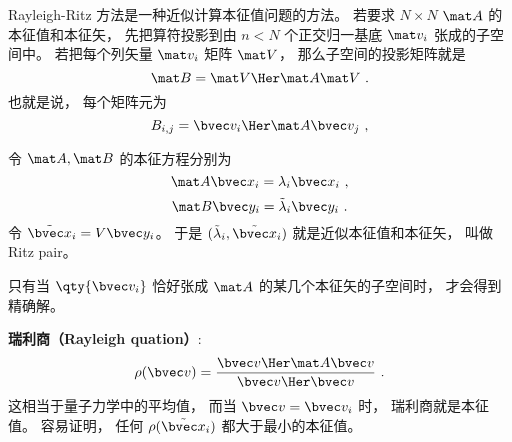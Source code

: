 
\begin{issues}
\issueDraft
\end{issues}


Rayleigh-Ritz 方法是一种近似计算本征值问题的方法。 若要求 $N\times N$  $\mat A$ 的本征值和本征矢， 先把算符投影到由 $n < N$ 个正交归一基底 $\mat v_i$ 张成的子空间中。 若把每个列矢量 $\mat v_i$ 矩阵 $\mat V$， 那么子空间的投影矩阵就是
\begin{equation}
\mat B = \mat V\Her \mat A \mat V~.
\end{equation}
也就是说， 每个矩阵元为
\begin{equation}
B_{i,j} = \bvec v_i\Her \mat A \bvec v_j~,
\end{equation}

令 $\mat A, \mat B$ 的本征方程分别为
\begin{equation}
\mat A \bvec x_i = \lambda_i \bvec x_i~,
\end{equation}
\begin{equation}
\mat B \bvec y_i = \tilde\lambda_i \bvec y_i~.
\end{equation}
令 $\tilde{\bvec x}_i = V \bvec y_i$。 于是 $(\tilde\lambda_i, \tilde{\bvec x}_i)$ 就是近似本征值和本征矢， 叫做 Ritz pair。

只有当 $\qty{\bvec v_i}$ 恰好张成 $\mat A$ 的某几个本征矢的子空间时， 才会得到精确解。

\textbf{瑞利商（Rayleigh quation）}:
\begin{equation}
\rho(\bvec v) = \frac{\bvec v\Her \mat A \bvec v}{\bvec v\Her \bvec v}~.
\end{equation}
这相当于量子力学中的平均值， 而当 $\bvec v = \bvec v_i$ 时， 瑞利商就是本征值。 容易证明， 任何 $\rho(\tilde {\bvec x}_i)$ 都大于最小的本征值。
